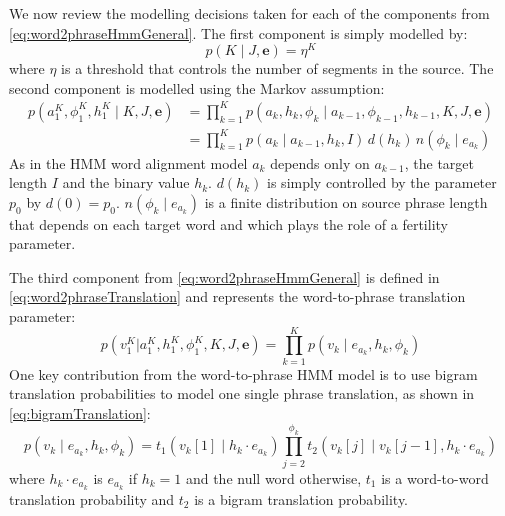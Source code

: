 %
We now review the modelling decisions taken for each
of the components from \autoref{eq:word2phraseHmmGeneral}.
The first component is simply modelled by:
%
\begin{equation}
  p(K \mid J, \bm{e}) = \eta^K
\end{equation}
%
where $\eta$ is a threshold that controls the number of segments in the source.
The second component is modelled using the Markov assumption:
%
\begin{align}
  p(a_1^K, \phi_1^K, h_1^K \mid K, J, \bm{e})
    &= \prod_{k = 1}^K p(a_k, h_k, \phi_k \mid a_{k - 1}, \phi_{k - 1}, h_{k - 1}, K, J, \bm{e}) \nonumber \\
    &= \prod_{k = 1}^K p(a_k \mid a_{k - 1}, h_k, I) \, d(h_k) \, n(\phi_k \mid e_{a_k})
\end{align}
%
As in the HMM word alignment model $a_k$ depends only on $a_{k - 1}$, the target
length $I$ and the binary value $h_k$. $d(h_k)$ is simply controlled by the
parameter $p_0$ by $d(0) = p_0$. $n(\phi_k \mid e_{a_k})$ is a finite distribution
on source phrase length that depends on each target word and which plays the role
of a fertility parameter.

The third component from \autoref{eq:word2phraseHmmGeneral} is defined in
\autoref{eq:word2phraseTranslation} and represents the word-to-phrase translation parameter:
%
\begin{equation}
  p(v_1^K | a_1^K, h_1^K, \phi_1^K, K, J, \bm{e}) = \prod_{k = 1}^K p(v_k \mid e_{a_k}, h_k, \phi_k)
  \label{eq:word2phraseTranslation}
\end{equation}
%
One key contribution from the word-to-phrase HMM model is to use bigram translation
probabilities to model one single phrase translation, as shown
in \autoref{eq:bigramTranslation}:
%
\begin{equation}
  p(v_k \mid e_{a_k}, h_k, \phi_k) = t_1(v_k[1] \mid h_k \cdot e_{a_k}) \prod_{j = 2}^{\phi_k} t_2(v_k[j] \mid v_k[j - 1], h_k \cdot e_{a_k})
  \label{eq:bigramTranslation}
\end{equation}
%
where $h_k \cdot e_{a_k}$ is $e_{a_k}$ if $h_k = 1$ and the null word otherwise, $t_1$ is
a word-to-word translation probability and $t_2$ is a bigram translation probability.

